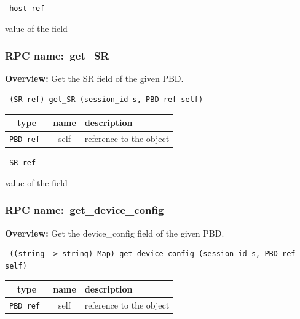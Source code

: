 {\tt 
host ref
}


value of the field
\vspace{0.3cm}
\vspace{0.3cm}
\vspace{0.3cm}
\subsubsection{RPC name:~get\_SR}

{\bf Overview:} 
Get the SR field of the given PBD.

\begin{verbatim} (SR ref) get_SR (session_id s, PBD ref self)\end{verbatim}



 
\vspace{0.3cm}
\begin{tabular}{|c|c|p{7cm}|}
 \hline
{\bf type} & {\bf name} & {\bf description} \\ \hline
{\tt PBD ref } & self & reference to the object \\ \hline 

\end{tabular}

\vspace{0.3cm}

{\tt 
SR ref
}


value of the field
\vspace{0.3cm}
\vspace{0.3cm}
\vspace{0.3cm}
\subsubsection{RPC name:~get\_device\_config}

{\bf Overview:} 
Get the device\_config field of the given PBD.

\begin{verbatim} ((string -> string) Map) get_device_config (session_id s, PBD ref self)\end{verbatim}



 
\vspace{0.3cm}
\begin{tabular}{|c|c|p{7cm}|}
 \hline
{\bf type} & {\bf name} & {\bf description} \\ \hline
{\tt PBD ref } & self & reference to the object \\ \hline 

\end{tabular}

